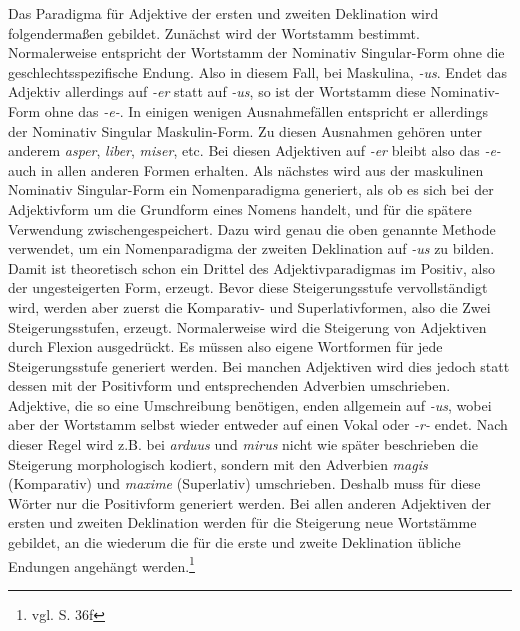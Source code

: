 \documentclass[fontsize=12pt,abstract=on,titlepage,bibliography=totoc,ngerman,listof=totoc]{scrreprt}
\begin{document}
Das Paradigma für Adjektive der ersten und zweiten Deklination wird folgendermaßen gebildet. Zunächst wird der Wortstamm bestimmt. Normalerweise entspricht der Wortstamm der Nominativ Singular-Form ohne die geschlechtsspezifische Endung. Also in diesem Fall, bei Maskulina, \textit{-us}. Endet das Adjektiv allerdings auf \textit{-er} statt auf \textit{-us}, so ist der Wortstamm diese Nominativ-Form ohne das \textit{-e-}. In einigen wenigen Ausnahmefällen entspricht er allerdings der Nominativ Singular Maskulin-Form. Zu diesen Ausnahmen gehören unter anderem \textit{asper}, \textit{liber}, \textit{miser}, etc. Bei diesen Adjektiven auf \textit{-er} bleibt also das \textit{-e-} auch in allen anderen Formen erhalten. Als nächstes wird aus der maskulinen Nominativ Singular-Form ein Nomenparadigma generiert, als ob es sich bei der Adjektivform um die Grundform eines Nomens handelt, und für die spätere Verwendung zwischengespeichert. Dazu wird genau die oben genannte Methode verwendet, um ein Nomenparadigma der zweiten Deklination auf \textit{-us} zu bilden. Damit ist theoretisch schon ein Drittel des Adjektivparadigmas im Positiv, also der ungesteigerten Form, erzeugt. Bevor diese Steigerungsstufe vervollständigt wird, werden aber zuerst die Komparativ- und Superlativformen, also die Zwei Steigerungsstufen, erzeugt. Normalerweise wird die Steigerung von Adjektiven durch Flexion ausgedrückt. Es müssen also eigene Wortformen für jede Steigerungsstufe generiert werden. Bei manchen Adjektiven wird dies jedoch statt dessen mit der Positivform und entsprechenden Adverbien umschrieben. Adjektive, die so eine Umschreibung benötigen, enden allgemein auf \textit{-us}, wobei aber der Wortstamm selbst wieder entweder auf einen Vokal oder \textit{-r-} endet. Nach dieser Regel wird z.B. bei \textit{arduus} und \textit{mirus} nicht wie später beschrieben die Steigerung morphologisch kodiert, sondern mit den Adverbien \textit{magis} (Komparativ) und \textit{maxime} (Superlativ) umschrieben. Deshalb muss für diese Wörter nur die Positivform generiert werden. Bei allen anderen Adjektiven der ersten und zweiten Deklination werden für die Steigerung neue Wortstämme gebildet, an die wiederum die für die erste und zweite Deklination übliche Endungen angehängt werden.\footnote{vgl. \cite{BAYER-LINDAUER1994} S. 36f} \par
\end{document}
